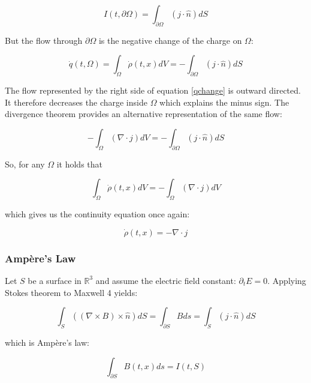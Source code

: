 \documentclass{article}
\begin{document}
\begin{equation} \label{flux1}
I(t, \partial \Omega) = \int_{\partial \Omega} (j \cdot \hat{n}) dS
\end{equation}

But the flow through $\partial \Omega$ is the negative change of the charge on $\Omega$:

\begin{equation} \label{qchange}
\dot q(t, \Omega) = \int_{\Omega} \dot \rho(t, x) dV = - \int_{\partial \Omega} (j \cdot \hat{n}) dS
\end{equation}

The flow represented by the right side of equation \ref{qchange} is outward directed. It therefore decreases the charge inside $\Omega$ which explains the minus sign. The divergence theorem provides an alternative representation of the same flow: 

\begin{equation} \label{qchange1}
- \int_{\Omega} (\nabla \cdot j) dV = - \int_{\partial \Omega} (j \cdot \hat{n}) dS
\end{equation}

So, for any $\Omega$ it holds that 

\begin{equation} \label{qchange2}
 \int_{\Omega} \dot \rho(t, x) dV = - \int_{\Omega} (\nabla \cdot j) dV
\end{equation}

which gives us the continuity equation once again:

\begin{equation} \label{qchange3}
\dot \rho(t, x) = - \nabla \cdot j
\end{equation}

\subsubsection{Ampère's Law}

Let $S$ be a surface in $\mathbb{R}^3$ and assume the electric field constant: $\partial_t E = 0$.
Applying Stokes theorem to Maxwell 4 yields:
 
\begin{equation} \label{ampere0}
\int_S ((\nabla \times B) \times \hat n) dS = \int_{\partial S} B ds
= \int_S (j \cdot \hat n) dS
\end{equation}

which is Ampère's law:

\begin{equation} \label{ampere}
\int_{\partial S} B(t, x) ds = I(t, S)
\end{equation}
\end{document}

